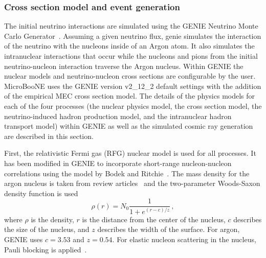   \subsubsection{Cross section model and event generation}
    The initial neutrino interactions are simulated using the GENIE Neutrino
    Monte Carlo Generator~\cite{Andreopoulos:2009rq,Andreopoulos:2015wxa}.
    Assuming a given neutrino flux, genie simulates the interaction of the
    neutrino with the nucleons inside of an Argon atom. It also simulates the
    intranuclear interactions that occur while the nucleons and pions from the
    initial neutrino-nucleon interaction traverse the Argon nucleus.  Within
    GENIE the nuclear models and neutrino-nucleon cross sections are
    configurable by the user.  MicroBooNE uses the GENIE version v2\_12\_2
    default settings with the addition of the empirical MEC cross section
    model. The details of the physics models for each of the four processes
    (the nuclear physics model, the cross section model, the neutrino-induced
    hadron production model, and the intranuclear hadron transport model)
    within GENIE as well as the simulated cosmic ray generation are described
    in this section.

    First, the relativistic Fermi gas (RFG) nuclear model is used for all
    processes. It has been modified in GENIE to incorporate short-range
    nucleon-nucleon correlations using the model by Bodek and
    Ritchie~\cite{BodekrRitchie}. The mass density for the argon nucleus is
    taken from review articles~\cite{nucdensity} and the two-parameter
    Woods-Saxon density function is used~\cite{WoodsSaxon}
    \begin{equation}\label{eq:woodssaxon}
      \rho(r) = N_0\frac{1}{1+e^{(r-c)/z}} \,,
    \end{equation}
    where $\rho$ is the density, $r$ is the distance from the center of the
    nucleus, $c$ describes the size of the nucleus, and $z$ describes the width
    of the surface. For argon, GENIE uses $c=3.53$ and $z=0.54$.  For elastic
    nucleon scattering in the nucleus, Pauli blocking is
    applied~\cite{PauliBlock}.
    
